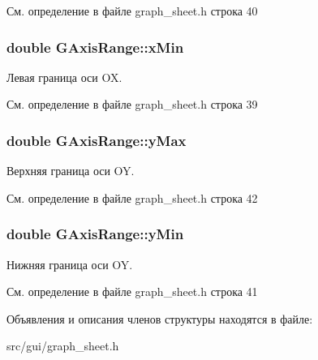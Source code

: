 См. определение в файле graph\+\_\+sheet.\+h строка 40

\subsubsection[{\texorpdfstring{x\+Min}{xMin}}]{\setlength{\rightskip}{0pt plus 5cm}double G\+Axis\+Range\+::x\+Min}\hypertarget{struct_g_axis_range_a01a9d0fa30092286df72949de7da0d1f}{}\label{struct_g_axis_range_a01a9d0fa30092286df72949de7da0d1f}
Левая граница оси OX. 

См. определение в файле graph\+\_\+sheet.\+h строка 39

\subsubsection[{\texorpdfstring{y\+Max}{yMax}}]{\setlength{\rightskip}{0pt plus 5cm}double G\+Axis\+Range\+::y\+Max}\hypertarget{struct_g_axis_range_a4b2aad8d5fd79b13d555b278ca3b2fb2}{}\label{struct_g_axis_range_a4b2aad8d5fd79b13d555b278ca3b2fb2}
Верхняя граница оси OY. 

См. определение в файле graph\+\_\+sheet.\+h строка 42

\subsubsection[{\texorpdfstring{y\+Min}{yMin}}]{\setlength{\rightskip}{0pt plus 5cm}double G\+Axis\+Range\+::y\+Min}\hypertarget{struct_g_axis_range_abc64e1b37194dc086641670a92c62837}{}\label{struct_g_axis_range_abc64e1b37194dc086641670a92c62837}
Нижняя граница оси OY. 

См. определение в файле graph\+\_\+sheet.\+h строка 41



Объявления и описания членов структуры находятся в файле\+:\begin{DoxyCompactItemize}
\item 
src/gui/graph\+\_\+sheet.\+h\end{DoxyCompactItemize}
